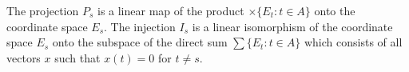 The projection $P_s$ is a linear map of the product $\times \{E_t : t \in A\}$ onto the coordinate space $E_s$. The injection $I_s$ is a linear isomorphism of the coordinate space $E_s$ onto the subspace of the direct sum $\sum \{E_t : t \in A\}$ which consists of all vectors $x$ such that $x(t) = 0$ for $t \neq s$.
